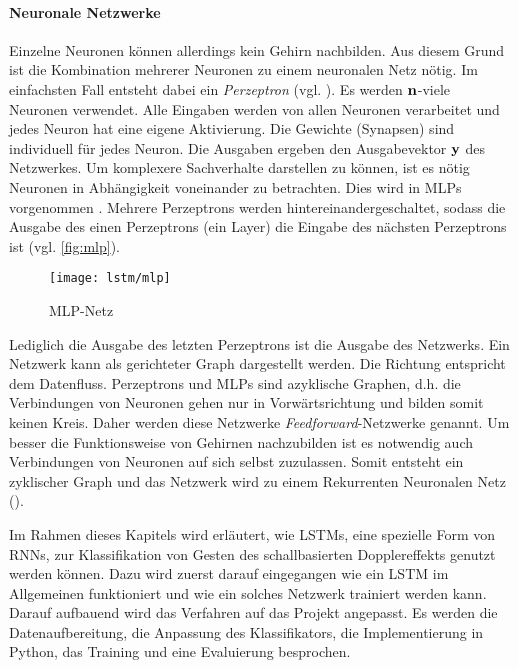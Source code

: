 \paragraph{Neuronale Netzwerke}
Einzelne Neuronen können allerdings kein Gehirn nachbilden. Aus diesem Grund ist
die Kombination mehrerer Neuronen zu einem neuronalen Netz nötig. Im einfachsten
Fall entsteht dabei ein \textit{Perzeptron} (vgl.
\cite{rosenblatt58a,1165576}). Es werden $\bf n$-viele Neuronen verwendet. Alle
Eingaben werden von allen Neuronen verarbeitet und jedes Neuron hat eine eigene
Aktivierung. Die Gewichte (Synapsen) sind individuell für jedes Neuron. Die
Ausgaben ergeben den Ausgabevektor $\bf{y}$ des Netzwerkes. Um komplexere
Sachverhalte darstellen zu können, ist es nötig Neuronen in Abhängigkeit
voneinander zu betrachten. Dies wird in \acp{MLP} vorgenommen \cite{1165576}.
Mehrere Perzeptrons werden hintereinandergeschaltet, sodass die Ausgabe des
einen Perzeptrons (ein Layer) die Eingabe des nächsten Perzeptrons ist (vgl.
\autoref{fig:mlp}).
\begin{figure}[htbp]
    \centering
   \texttt{[image: lstm/mlp]}
\caption{MLP-Netz}
\label{fig:mlp}
\end{figure}
Lediglich die Ausgabe des letzten Perzeptrons ist die Ausgabe des Netzwerks.
Ein Netzwerk kann als gerichteter Graph dargestellt werden. Die Richtung
entspricht dem Datenfluss. Perzeptrons und \acp{MLP} sind azyklische Graphen,
d.h. die Verbindungen von Neuronen gehen nur in Vorwärtsrichtung und bilden
somit keinen Kreis. Daher werden diese Netzwerke \textit{Feedforward}-Netzwerke
genannt. Um besser die Funktionsweise von Gehirnen nachzubilden ist es notwendig
auch Verbindungen von Neuronen auf sich selbst zuzulassen. Somit entsteht ein
zyklischer Graph und das Netzwerk wird zu einem Rekurrenten Neuronalen Netz
(). \cite{RainerSchmoll2006}

Im Rahmen dieses Kapitels wird erläutert, wie \acsp{LSTM}, eine spezielle Form
von \acp{RNN}, zur Klassifikation von Gesten des schallbasierten Dopplereffekts
genutzt werden können. Dazu wird zuerst darauf eingegangen wie ein \ac{LSTM} im
Allgemeinen funktioniert und wie ein solches Netzwerk trainiert werden kann.
Darauf aufbauend wird das Verfahren auf das Projekt angepasst. Es werden die
Datenaufbereitung, die Anpassung des Klassifikators, die Implementierung in
Python, das Training und eine Evaluierung besprochen.


